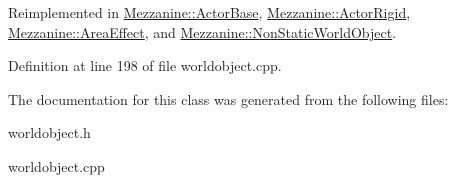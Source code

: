 Reimplemented in \hyperlink{classMezzanine_1_1ActorBase_a24d196b9fc55048fb183a7920b5bbd3e}{Mezzanine::ActorBase}, \hyperlink{classMezzanine_1_1ActorRigid_ad640944179df98fbaf5ecf5e2ed5ba2c}{Mezzanine::ActorRigid}, \hyperlink{classMezzanine_1_1AreaEffect_acb6f2cb173aa78725d82d5d33af5b866}{Mezzanine::AreaEffect}, and \hyperlink{classMezzanine_1_1NonStaticWorldObject_a1e1300809a35fe8263928ce890e1f91a}{Mezzanine::NonStaticWorldObject}.



Definition at line 198 of file worldobject.cpp.



The documentation for this class was generated from the following files:\begin{DoxyCompactItemize}
\item 
worldobject.h\item 
worldobject.cpp\end{DoxyCompactItemize}
